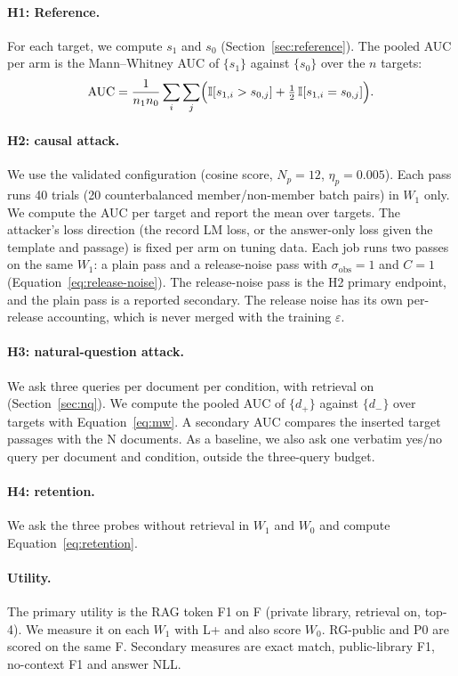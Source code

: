 \documentclass[11pt]{article}
\newcommand{\ind}{\mathbb{I}}
\newcommand{\AUC}{\operatorname{AUC}}
\begin{document}
\paragraph{H1: Reference.} For each target, we compute $s_1$ and $s_0$ (Section~\ref{sec:reference}). The pooled AUC per arm is the Mann--Whitney AUC of $\{s_1\}$ against $\{s_0\}$ over the $n$ targets:
\begin{equation}
  \AUC=\frac{1}{n_1n_0}\sum_{i}\sum_{j}\Bigl(\ind[s_{1,i}>s_{0,j}]+\tfrac12\,\ind[s_{1,i}=s_{0,j}]\Bigr).
  \label{eq:mw}
\end{equation}

\paragraph{H2: causal attack.} We use the validated configuration (cosine score, $N_p=12$, $\eta_p=0.005$). Each pass runs 40 trials (20 counterbalanced member/non-member batch pairs) in $W_1$ only. We compute the AUC per target and report the mean over targets. The attacker's loss direction (the record LM loss, or the answer-only loss given the template and passage) is fixed per arm on tuning data. Each job runs two passes on the same $W_1$: a plain pass and a release-noise pass with $\sigma_{\mathrm{obs}}=1$ and $C=1$ (Equation~\eqref{eq:release-noise}). The release-noise pass is the H2 primary endpoint, and the plain pass is a reported secondary. The release noise has its own per-release accounting, which is never merged with the training $\varepsilon$.

\paragraph{H3: natural-question attack.} We ask three queries per document per condition, with retrieval on (Section~\ref{sec:nq}). We compute the pooled AUC of $\{d_+\}$ against $\{d_-\}$ over targets with Equation~\eqref{eq:mw}. A secondary AUC compares the inserted target passages with the N documents. As a baseline, we also ask one verbatim yes/no query per document and condition, outside the three-query budget.

\paragraph{H4: retention.} We ask the three probes without retrieval in $W_1$ and $W_0$ and compute Equation~\eqref{eq:retention}.

\paragraph{Utility.} The primary utility is the RAG token F1 on F (private library, retrieval on, top-4). We measure it on each $W_1$ with L+ and also score $W_0$. RG-public and P0 are scored on the same F. Secondary measures are exact match, public-library F1, no-context F1 and answer NLL.
\end{document}
